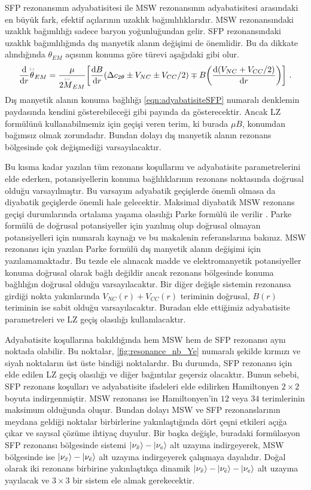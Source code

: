 SFP rezonansının adyabatisitesi ile MSW rezonansının adyabatisitesi arasındaki en büyük fark, efektif açılarının uzaklık bağımlılıklarıdır. MSW rezonansındaki uzaklık bağımlılığı sadece baryon yoğunluğundan gelir. SFP rezonansındaki uzaklık bağımlılığında dış manyetik alanın değişimi de önemlidir. Bu da dikkate alındığında $ \theta_{EM} $ açısının konuma göre türevi aşağıdaki gibi olur.  
\begin{equation}
	\dv{r} \barparen{\theta}_{EM} = \frac{\mu}{2 \barparen{M}_{EM}} \qty[\dv{B}{r}\qty(\Delta c_{2\theta}\pm V_{NC} \pm V_{CC}/2) \mp B\qty(\dv{(V_{NC}+ V_{CC}/2)}{r})] \text{ .}
\end{equation}
Dış manyetik alanın konuma bağlılığı \eqref{eqn:adyabatisiteSFP} numaralı denklemin paydasında kendini gösterebileceği gibi payında da gösterecektir. Ancak LZ formülünü kullanabilmemiz için geçişi veren terim, ki burada $ \mu B $, konumdan bağımsız olmak zorundadır. Bundan dolayı dış manyetik alanın rezonans bölgesinde çok değişmediği varsayılacaktır.

Bu kısma kadar yazılan tüm rezonans koşullarını ve adyabatisite parametrelerini elde ederken, potansiyellerin konuma bağlılıklarının rezonans noktasında doğrusal olduğu varsayılmıştır. Bu varsayım adyabatik geçişlerde önemli olmasa da diyabatik geçişlerde önemli hale gelecektir. Maksimal diyabatik MSW rezonans geçişi durumlarında ortalama yaşama olasılığı Parke formülü ile verilir \cite{Parke:1986jy}. Parke formülü de doğrusal potansiyeller için yazılmış olup doğrusal olmayan potansiyelleri için \cite{Kuo:1989qe} numaralı kaynağı ve bu makalenin referanslarına bakınız. MSW rezonansı için yazılan Parke formülü dış manyetik alanın değişimi için yazılamamaktadır. Bu tezde ele alınacak madde ve elektromanyetik potansiyeller konuma doğrusal olarak bağlı değildir ancak rezonans bölgesinde konuma bağlılığın doğrusal olduğu varsayılacaktır. Bir diğer değişle sistemin rezonansa girdiği nokta yakınlarında $ V_{NC}(r)+ V_{CC}(r) $ teriminin doğrusal, $ B(r) $ teriminin ise sabit olduğu varsayılacaktır. Buradan elde ettiğimiz adyabatisite parametreleri ve LZ geçiş olasılığı kullanılacaktır.

Adyabatisite koşullarına bakıldığında hem MSW hem de SFP rezonansı aynı noktada olabilir. Bu noktalar, \ref{fig:resonance_nb_Ye} numaralı şekilde kırmızı ve siyah noktaların üst üste bindiği noktalardır. Bu durumda, SFP rezonansı için elde edilen LZ geçiş olasılığı ve diğer bağıntılar geçersiz olacaktır. Bunun sebebi, SFP rezonans koşulları ve adyabatisite ifadeleri elde edilirken Hamiltonyen $ 2\times2 $ boyuta indirgenmiştir. MSW rezonansı ise Hamiltonyen'in $ 12 $ veya $ 34 $ terimlerinin maksimum olduğunda oluşur. Bundan dolayı MSW ve SFP rezonanslarının meydana geldiği noktalar birbirlerine yakınlaştığında dört çeşni etkileri açığa çıkar ve sayısal çözüme ihtiyaç duyulur.
Bir başka değişle, buradaki formülasyon SFP rezonansı bölgesinde sistemi $ \ket{\nu_{\bar{x}}}-\ket{\nu_{e}} $ alt uzayına indirgeyerek, MSW bölgesinde ise $ \ket{\nu_{\bar{x}}}-\ket{\nu_{\bar{e}}} $ alt uzayına indirgeyerek çalışmaya dayalıdır. Doğal olarak iki rezonans birbirine yakınlaştıkça dinamik $ \ket{\nu_{\bar{x}}}-\ket{\nu_{\bar{e}}}-\ket{\nu_{e}} $ alt uzayına yayılacak ve $ 3\times3 $ bir sistem ele almak gerekecektir.

